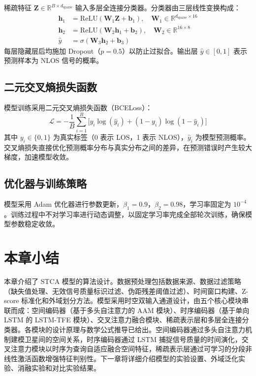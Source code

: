     稀疏特征 $\bm{Z} \in \mathbb{R}^{B \times d_{\text{sparse}}}$ 输入多层全连接分类器。分类器由三层线性变换构成：
    \begin{align}
    \bm{h}_1 &= \text{ReLU}(\bm{W}_1 \bm{Z} + \bm{b}_1), \quad \bm{W}_1 \in \mathbb{R}^{d_{\text{sparse}} \times 16} \\
    \bm{h}_2 &= \text{ReLU}(\bm{W}_2 \bm{h}_1 + \bm{b}_2), \quad \bm{W}_2 \in \mathbb{R}^{16 \times 8} \\
    \hat{y}  &= \sigma(\bm{W}_3 \bm{h}_2 + \bm{b}_3)
    \end{align}
    每层隐藏层后均施加 Dropout（$p = 0.5$）以防止过拟合。输出层 $\hat{y} \in [0, 1]$ 表示预测样本为 NLOS 信号的概率。

\subsection{二元交叉熵损失函数}

    模型训练采用二元交叉熵损失函数（BCELoss）：
    \begin{equation}
    \mathcal{L} = -\frac{1}{B}\sum_{i=1}^{B} \big[ y_i \log(\hat{y}_i) + (1 - y_i) \log(1 - \hat{y}_i) \big]
    \end{equation}
    其中 $y_i \in \{0, 1\}$ 为真实标签（0 表示 LOS，1 表示 NLOS），$\hat{y}_i$ 为模型预测概率。交叉熵损失直接优化预测概率分布与真实分布之间的差异，在预测错误时产生较大梯度，加速模型收敛。

\subsection{优化器与训练策略}

    模型采用 Adam 优化器进行参数更新，$\beta_1 = 0.9$，$\beta_2 = 0.98$，学习率固定为 $10^{-4}$。训练过程中不对学习率进行动态调整，以固定学习率完成全部轮次训练，确保模型参数稳定收敛。

\section{本章小结}

    本章介绍了 STCA 模型的算法设计。数据预处理包括数据来源、数据过滤策略（缺失值处理、无效信号质量标识过滤、伪距残差阈值过滤）、时间窗口构建、Z-score 标准化和外域划分方法。模型采用时空双输入通道设计，由五个核心模块串联而成：空间编码器（基于多头自注意力的 AAM 模块）、时序编码器（基于单向 LSTM 的 LSTM-TFE 模块）、交叉注意力融合模块、稀疏表示层和多层全连接分类器。各模块的设计原理与数学公式推导已给出。空间编码器通过多头自注意力机制建模卫星间的空间关系，时序编码器通过 LSTM 捕捉信号质量的时间演化，交叉注意力模块以时序为查询自适应融合空间特征，稀疏表示层通过可学习的分段非线性激活函数增强特征判别性。下一章将详细介绍模型的实验设置、外域泛化实验、消融实验和对比实验结果。